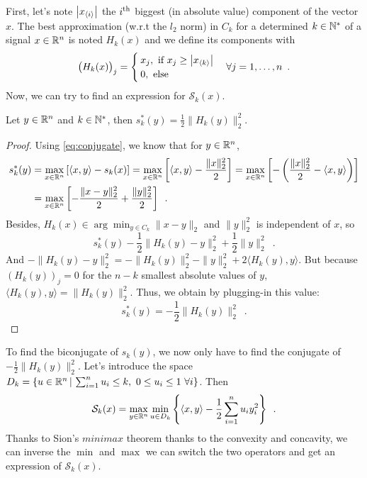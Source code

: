 First, let's note $\left|x_{\langle i\rangle}\right|$ the $i\textsuperscript{th}$ biggest (in absolute value) component of the vector $x$. The best approximation (w.r.t the $l_2$ norm) in $C_k$ for a determined $k\in\mathbb{N}^*$ of a signal $x\in\mathbb{R}^n$ is noted $H_k(x)$ and we define its components with 
\[\big(H_k(x)\big)_j = \begin{cases} x_j,\text{ if }x_j \geq \left|x_{\langle k\rangle}\right| \\
0, \text{ else }\end{cases} \forall j =1,\dots, n\enspace. \]
Now, we can try to find an expression for $\mathcal{S}_k(x)$.

\begin{proposition}\label{prop:skstar}
Let $y\in\mathbb{R}^n$ and $k\in\mathbb{N}^*$, then $s_k^*(y) = \frac{1}{2}\|H_k(y)\|^2_2$.
\end{proposition}

\begin{proof}
Using \eqref{eq:conjugate}, we know that for $y\in\mathbb{R}^n$,
\[
\begin{aligned}
s_k^*(y) & = \max_{x\in\mathbb{R}^n}\left[\langle x,y\rangle - s_k(x)\right] = \max_{x\in\mathbb{R}^n}\left[\langle x,y\rangle - \frac{\|x\|_2^2}{2}\right]
          = \max_{x\in\mathbb{R}^n}\left[-\left(\frac{\|x\|^2_2}{2} - \langle x, y\rangle\right) \right]\\
          &= \max_{x\in\mathbb{R}^n}\left[-\frac{\|x-y\|^2_2}{2} + \frac{\|y\|^2_2}{2} \right] \enspace.
\end{aligned}
\]
Besides, $H_k(x)\in\arg\min_{y\in C_k}\|x-y\|_2$ and $\|y\|_2^2$ is independent of $x$, so 
\[s_k^*(y) -\frac{1}{2}\|H_k(y) - y\|^2_2 + \frac{1}{2}\|y\|_2^2\enspace.\]
And $-\|H_k(y) -y\|^2_2 = -\|H_k(y)\|_2^2 - \|y\|^2_2 + 2 \langle H_k(y),y\rangle$. But because $(H_k(y))_j=0$ for the $n-k$ smallest absolute values of $y$, $\langle H_k(y),y\rangle = \|H_k(y)\|_2^2$. Thus, we obtain by plugging-in this value:
\[s_k^*(y) = -\frac{1}{2}\|H_k(y)\|_2^2\enspace.\]
\end{proof}

To find the biconjugate of $s_k(y)$, we now only have to find the conjugate of $-\frac{1}{2}\|H_k(y)\|^2_2$. Let's introduce the space $D_k=\{u\in\mathbb{R}^n\,|\,\sum_{i=1}^n u_i \leq k,\  0\leq u_i\leq 1\ \forall i\}$. Then 
\begin{equation}\label{eq:minmax}
\mathcal{S}_k(x) = \max_{y\in\mathbb{R}^n}\min_{u\in D_k}\left\{\langle x, y\rangle - \frac{1}{2}\sum_{i=1}^n u_iy_i^2\right\}\enspace.
\end{equation}
Thanks to Sion's $minimax$ theorem \cite{10.2307/30037472} thanks to the convexity and concavity, we can inverse the $\min$ and $\max$ we can switch the two operators and get an expression of $\mathcal{S}_k(x)$.

